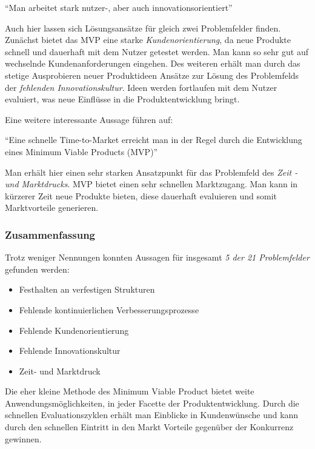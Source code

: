 \begin{center}
	``Man arbeitet stark  nutzer-, aber auch innovationsorientiert'' \cite[S. 13]{chanias_digital_2018}
\end{center}

Auch hier lassen sich Lösungsansätze für gleich zwei Problemfelder finden. Zunächst bietet das MVP eine starke \textit{Kundenorientierung}, da neue Produkte schnell und dauerhaft mit dem Nutzer getestet werden. Man kann so sehr gut auf wechselnde Kundenanforderungen eingehen. Des weiteren erhält man durch das stetige Ausprobieren neuer Produktideen Ansätze zur Lösung des Problemfelds der \textit{fehlenden Innovationskultur}. Ideen werden fortlaufen mit dem Nutzer evaluiert, was neue Einflüsse in die Produktentwicklung bringt.

Eine weitere interessante Aussage führen  auf:

\begin{center}
	``Eine schnelle Time-to-Market erreicht man in der Regel durch die Entwicklung eines Minimum Viable Products (MVP)'' \cite[S. 213]{gassmann_digitale_2016}
\end{center}

Man erhält hier einen sehr starken Ansatzpunkt für das Problemfeld des \textit{Zeit - und Marktdrucks}. MVP bietet einen sehr schnellen Marktzugang. Man kann in kürzerer Zeit neue Produkte bieten, diese dauerhaft evaluieren und somit Marktvorteile generieren.

\subsubsection{Zusammenfassung}

Trotz weniger Nennungen konnten Aussagen für insgesamt \textit{5 der 21 Problemfelder} gefunden werden:

 \begin{itemize}[noitemsep, topsep=0pt]
	\item Festhalten an verfestigen Strukturen
	\item Fehlende kontinuierlichen Verbesserungsprozesse
	\item Fehlende Kundenorientierung
	\item Fehlende Innovationskultur
	\item Zeit- und Marktdruck
\end{itemize}

Die eher kleine Methode des Minimum Viable Product bietet weite Anwendungsmöglichkeiten, in jeder Facette der Produktentwicklung. Durch die schnellen Evaluationszyklen erhält man Einblicke in Kundenwünsche und kann durch den schnellen Eintritt in den Markt Vorteile gegenüber der Konkurrenz gewinnen.

